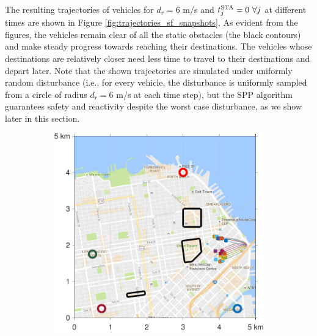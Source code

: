 The resulting trajectories of vehicles for $d_{r} = 6$ m/s and $t^\text{STA}_j = 0 ~ \forall j$ at different times are shown in Figure \ref{fig:trajectories_sf_snapshots}. As evident from the figures, the vehicles remain clear of all the static obstacles (the black contours) and make steady progress towards reaching their destinations. The vehicles whose destinations are relatively closer need less time to travel to their destinations and depart later. Note that the shown trajectories are simulated under uniformly random disturbance (i.e., for every vehicle, the disturbance is uniformly sampled from a circle of radius $d_{r} = 6$ m/s at each time step), but the SPP algorithm guarantees safety and reactivity despite the worst case disturbance, as we show later in this section.
%
\begin{figure}[!htb]
 \centering
\begin{subfigure}{0.5\textwidth}
  \includegraphics[width=\columnwidth]{figs/sf_d6sep0_s1}
  \subcaption{}
  \label{fig:sf_d6sep0_s1}
\end{subfigure}%
\begin{subfigure}{0.5\textwidth}

\end{subfigure}
\end{figure}
